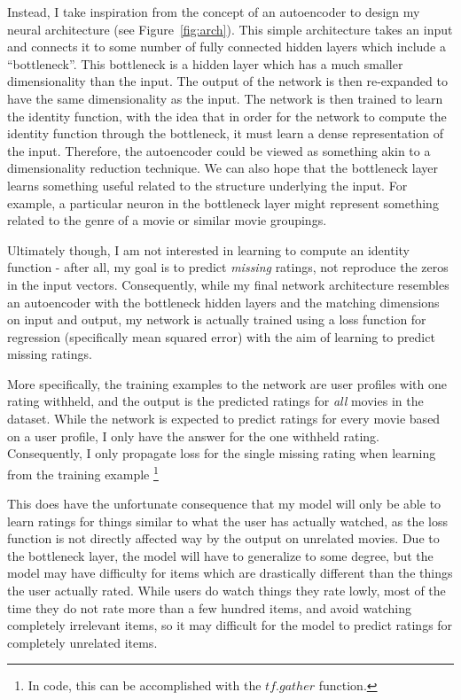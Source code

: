 \documentclass[12pt]{article}
\begin{document}
Instead, I take inspiration from the concept of an autoencoder to design my
neural architecture (see Figure~\ref{fig:arch}).
This simple architecture takes an input and connects it to some number of fully
connected hidden layers which include a ``bottleneck''.
This bottleneck is a hidden layer which has a much smaller dimensionality than the
input.
The output of the network is then re-expanded to have the same dimensionality
as the input.
The network is then trained to learn the identity function, with the idea that
in order for the network to compute the identity function through the
bottleneck, it must learn a dense representation of the input.
Therefore, the autoencoder could be viewed as something akin to a
dimensionality reduction technique.
We can also hope that the bottleneck layer learns something useful related to
the structure underlying the input.
For example, a particular neuron in the bottleneck layer might represent
something related to the genre of a movie or similar movie groupings.

Ultimately though, I am not interested in learning to compute an identity
function - after all, my goal is to predict \textit{missing} ratings, not
reproduce the zeros in the input vectors.
Consequently, while my final network architecture resembles an autoencoder with
the bottleneck hidden layers and the matching dimensions on input and output,
my network is actually trained using a loss function for regression
(specifically mean squared error)
with the aim of learning to predict missing ratings.

More specifically, the training examples to the network are user
profiles with one rating withheld, and the output is the predicted ratings for
\textit{all} movies in the dataset.
While the network is expected to predict ratings for every movie based on a
user profile, I only have the answer for the one withheld rating.
Consequently, I only propagate loss for the single missing rating when
learning from the training example%
\footnote{In code, this can be accomplished with the $tf.gather$ function.}

This does have the unfortunate consequence that my model will only be able to
learn ratings for things similar to what the user has actually watched, as the
loss function is not directly affected way by the output on unrelated movies.
Due to the bottleneck layer, the model will have to generalize to some degree,
but the model may have difficulty for items which are drastically different
than the things the user actually rated.
While users do watch things they rate lowly, most of the time they do not rate
more than a few hundred items, and avoid watching completely irrelevant items,
so it may difficult for the model to predict ratings for completely unrelated
items.
\end{document}

